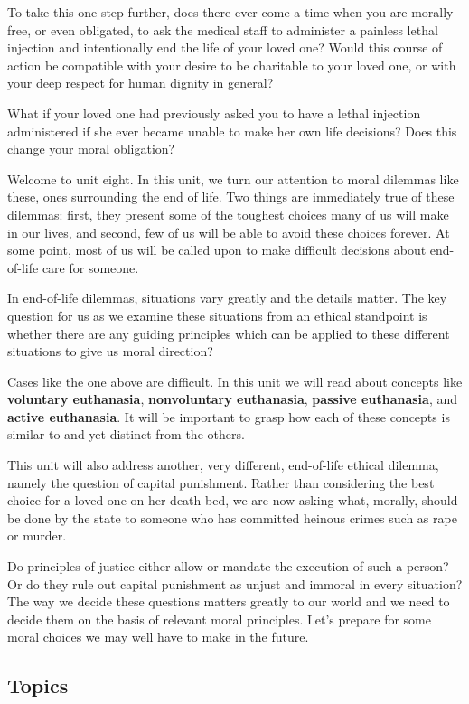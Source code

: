 \documentclass[
]{book}
\begin{document}
To take this one step further, does there ever come a time when you are morally free, or even obligated, to ask the medical staff to administer a painless lethal injection and intentionally end the life of your loved one? Would this course of action be compatible with your desire to be charitable to your loved one, or with your deep respect for human dignity in general?

What if your loved one had previously asked you to have a lethal injection administered if she ever became unable to make her own life decisions? Does this change your moral obligation?

Welcome to unit eight. In this unit, we turn our attention to moral dilemmas like these, ones surrounding the end of life. Two things are immediately true of these dilemmas: first, they present some of the toughest choices many of us will make in our lives, and second, few of us will be able to avoid these choices forever. At some point, most of us will be called upon to make difficult decisions about end-of-life care for someone.

In end-of-life dilemmas, situations vary greatly and the details matter. The key question for us as we examine these situations from an ethical standpoint is whether there are any guiding principles which can be applied to these different situations to give us moral direction?

Cases like the one above are difficult. In this unit we will read about concepts like \textbf{voluntary euthanasia}, \textbf{nonvoluntary euthanasia}, \textbf{passive euthanasia}, and \textbf{active euthanasia}. It will be important to grasp how each of these concepts is similar to and yet distinct from the others.

This unit will also address another, very different, end-of-life ethical dilemma, namely the question of capital punishment. Rather than considering the best choice for a loved one on her death bed, we are now asking what, morally, should be done by the state to someone who has committed heinous crimes such as rape or murder.

Do principles of justice either allow or mandate the execution of such a person? Or do they rule out capital punishment as unjust and immoral in every situation? The way we decide these questions matters greatly to our world and we need to decide them on the basis of relevant moral principles.
Let's prepare for some moral choices we may well have to make in the future.

\hypertarget{topics-7}{%
\subsection*{Topics}\label{topics-7}}
\end{document}
